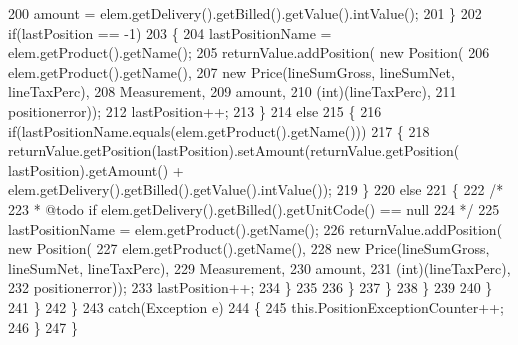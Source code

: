 \begin{DoxyCode}
200                             amount = elem.getDelivery().getBilled().getValue().intValue();
201                         \}
202                         \textcolor{keywordflow}{if}(lastPosition == -1)
203                         \{
204                             lastPositionName = elem.getProduct().getName();
205                             returnValue.addPosition( \textcolor{keyword}{new} Position(
206                                     elem.getProduct().getName(),
207                                     \textcolor{keyword}{new} Price(lineSumGross, lineSumNet, lineTaxPerc),
208                                     Measurement,
209                                     amount,
210                                     (int)(lineTaxPerc),
211                                     positionerror));
212                             lastPosition++;
213                         \}
214                         \textcolor{keywordflow}{else}
215                         \{
216                             \textcolor{keywordflow}{if}(lastPositionName.equals(elem.getProduct().getName()))
217                             \{
218                                 returnValue.getPosition(lastPosition).setAmount(returnValue.getPosition(
      lastPosition).getAmount() + elem.getDelivery().getBilled().getValue().intValue());
219                             \}
220                             \textcolor{keywordflow}{else}
221                             \{
222                                 \textcolor{comment}{/* }
223 \textcolor{comment}{                                 * @todo if elem.getDelivery().getBilled().getUnitCode() == null}
224 \textcolor{comment}{                                 */}
225                                 lastPositionName = elem.getProduct().getName();
226                                 returnValue.addPosition( \textcolor{keyword}{new} Position(
227                                         elem.getProduct().getName(),
228                                         \textcolor{keyword}{new} Price(lineSumGross, lineSumNet, lineTaxPerc),
229                                         Measurement,
230                                         amount,
231                                         (int)(lineTaxPerc),
232                                         positionerror));
233                                 lastPosition++;     
234                             \}
235 
236                         \}
237                     \}
238                 \}
239                 
240             \}
241         \}
242         \}
243         \textcolor{keywordflow}{catch}(Exception e)
244         \{
245             this.PositionExceptionCounter++;
246         \}
247     \}
\end{DoxyCode}
